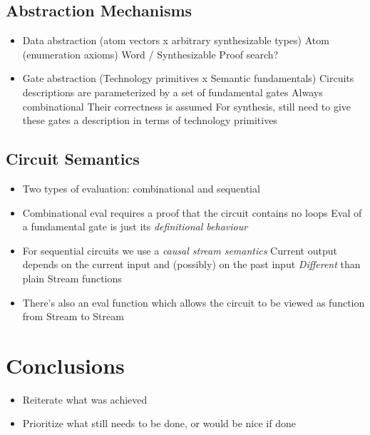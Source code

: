 \documentclass[a4paper,draft]{report}
\begin{document}
        \section{Abstraction Mechanisms}
        \label{sec:abstraction}
            \begin{itemize}
                \item Data abstraction (atom vectors x arbitrary synthesizable types)
                    \subitem Atom (enumeration axioms)
                    \subitem Word / Synthesizable
                        \subsubitem Proof search?
                \item Gate abstraction (Technology primitives x Semantic fundamentals)
                    \subitem Circuits descriptions are parameterized by a set of fundamental gates
                        \subsubitem Always combinational
                        \subsubitem Their correctness is assumed
                    \subitem For synthesis, still need to give these gates a description in terms of technology primitives
            \end{itemize}

        \section{Circuit Semantics}
        \label{sec:eval-seq}
            \begin{itemize}
                \item Two types of evaluation: combinational and sequential
                \item Combinational eval requires a proof that the circuit contains no loops
                    \subitem Eval of a fundamental gate is just its \emph{definitional behaviour}

                \item For sequential circuits we use a \emph{causal stream semantics}
                    \subitem Current output depends on the current input and (possibly) on the past input
                    \subitem \emph{Different} than plain Stream functions

                \item There's also an eval function which allows the circuit to be viewed as function from Stream to Stream
            \end{itemize}


    \chapter{Conclusions}
    \label{chap:conclusions}
        \begin{itemize}
            \item Reiterate what was achieved 
            \item Prioritize what still needs to be done, or would be nice if done
        \end{itemize}
\end{document}
